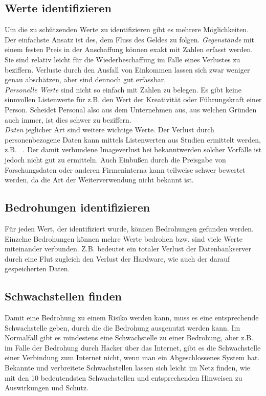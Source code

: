 \subsection{Werte identifizieren}
Um die zu schützenden Werte zu identifizieren gibt es mehrere Möglichkeiten. Der einfachste Ansatz ist des, dem Fluss des Geldes zu folgen. \textit{Gegenstände} mit einem festen Preis in der Anschaffung können exakt mit Zahlen erfasst werden. Sie sind relativ leicht für die Wiederbeschaffung im Falle eines Verlustes zu beziffern. Verluste durch den Ausfall von Einkommen lassen sich zwar weniger genau abschätzen, aber sind dennoch gut erfassbar.\\
\textit{Personelle Werte} sind nicht so einfach mit Zahlen zu belegen. Es gibt keine sinnvollen Listenwerte für z.B. den Wert der Kreativität oder Führungskraft einer Person. Scheidet Personal also aus dem Unternehmen aus, aus welchen Gründen auch immer, ist dies schwer zu beziffern.\\
\textit{Daten} jeglicher Art sind weitere wichtige Werte. Der Verlust durch personenbezogene Daten kann mittels Listenwerten aus Studien ermittelt werden, z.B. ~\cite{poneman2014}. Der damit verbundene Imageverlust bei bekanntwerden solcher Vorfälle ist jedoch nicht gut zu ermitteln. Auch Einbußen durch die Preisgabe von Forschungsdaten oder anderen Firmeninterna kann teilweise schwer bewertet werden, da die Art der Weiterverwendung nicht bekannt ist.

\subsection{Bedrohungen identifizieren}
Für jeden Wert, der identifiziert wurde, können Bedrohungen gefunden werden. Einzelne Bedrohungen können mehre Werte bedrohen bzw. sind viele Werte miteinander verbunden. Z.B. bedeutet ein totaler Verlust der Datenbankserver durch eine Flut  zugleich den Verlust der Hardware, wie auch der darauf gespeicherten Daten.

\subsection{Schwachstellen finden}
Damit eine Bedrohung zu einem Risiko werden kann, muss es eine entsprechende Schwachstelle geben, durch die die Bedrohung ausgenutzt werden kann. Im Normalfall gibt es mindestens eine Schwachstelle zu einer Bedrohung, aber z.B. im Falle der Bedrohung durch Hacker über das Internet, gibt es die Schwachstelle einer Verbindung zum Internet nicht, wenn man ein Abgeschlossenes System hat. Bekannte und verbreitete Schwachstellen lassen sich leicht im Netz finden, wie ~\cite{owasp2013} mit den 10 bedeutendsten Schwachstellen und entsprechenden Hinweisen zu Auswirkungen und Schutz.
